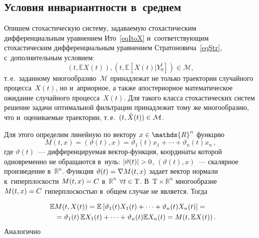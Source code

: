 \begin{multicols}{2}
\vspace*{-4pt}

\section{Условия инвариантности в~среднем}

Опишем стохастическую систему, задаваемую стохастическим 
дифференциальным уравнением Ито~\eqref{eqItoX} и~соответствующим стохастическим 
дифференциальным уравнением Стратоновича~\eqref{eqStr}, с~дополнительным условием:
$$
  (t,\mathbb{E} X(t)), (t,\mathbb{E}[X(t)|Y_0^t]) \in \mathcal{M},
$$
т.\,е.\ заданному многообразию~$\mathcal{M}$ принадлежат не только 
траектории случайного процесса~$X(t)$, но и~априорное, а также 
апостериорное математическое ожидание случайного процесса~$X(t)$. Для такого 
класса стохастических систем решение задачи оптимальной фильтрации принадлежит 
тому же многообразию, что и~оцениваемые траектории, т.\,е.\ $(t,\hat X(t)) \hm\in 
\mathcal{M}$.

Для этого определим линейную по вектору $x \hm\in \mathds{R}^n$ функцию
\begin{equation}
\label{eqDefM}
  M(t,x) = \left( \vartheta(t),x \right) = 
  \vartheta_1(t) x_1 + \cdots + \vartheta_n(t) x_n\,,
\end{equation}
где $\vartheta(t)$~--- дифференцируемая век\-тор-функ\-ция, координаты которой 
одновременно не обращаются в~нуль: $|\vartheta(t)| \hm> 0$, $(\vartheta(t),x)$~--- 
скалярное произведение в~$\mathds{R}^n$. Функция $\vartheta(t) \hm= \nabla M(t,x)$ 
задает вектор нормали к~гиперплоскости $M(t,x) \hm= C$ в~$\mathds{R}^n$ $\forall t 
\hm\in \mathrm{T}$. В~$\mathrm{T} \times \mathds{R}^n$ многообразие $M(t,x) \hm= C$ 
ги\-пер\-плос\-костью в~общем случае не является. Тогда

\vspace*{-6pt}

\noindent
\begin{multline*}
 \! \!\!\mathbb{E} M(t,X(t)) = \mathbb{E} \left[ 
  \vartheta_1(t) X_1(t) + \cdots + \vartheta_n(t) X_n(t) \right] ={} \\
\hspace*{7pt}{}  = \vartheta_1(t) \, \mathbb{E} X_1(t) + \cdots + \vartheta_n(t) 
 \mathbb{E} X_n(t) = M(t,\mathbb{E} X(t))\,.\hspace*{-7pt}
\end{multline*}
Аналогично

\vspace*{-6pt}


\end{multicols}
